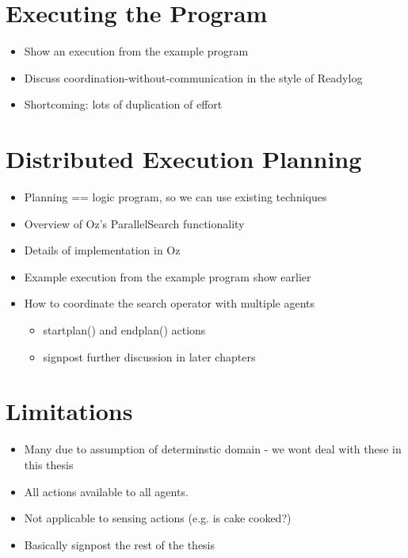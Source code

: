 \section{Executing the Program}
\begin{itemize}
\item Show an execution from the example program
\item Discuss coordination-without-communication in the style of Readylog
\item Shortcoming: lots of duplication of effort
\end{itemize}

\section{Distributed Execution Planning}
\begin{itemize}
\item Planning == logic program, so we can use existing techniques
\item Overview of Oz's ParallelSearch functionality
\item Details of implementation in Oz
\item Example execution from the example program show earlier
\item How to coordinate the search operator with multiple agents
  \begin{itemize}
  \item startplan() and endplan() actions
  \item signpost further discussion in later chapters
  \end{itemize}
\end{itemize}

\section{Limitations}
\begin{itemize}
\item Many due to assumption of determinstic domain - we wont deal with these in this thesis
\item All actions available to all agents. 
\item Not applicable to sensing actions (e.g. is cake cooked?)
\item Basically signpost the rest of the thesis
\end{itemize}

